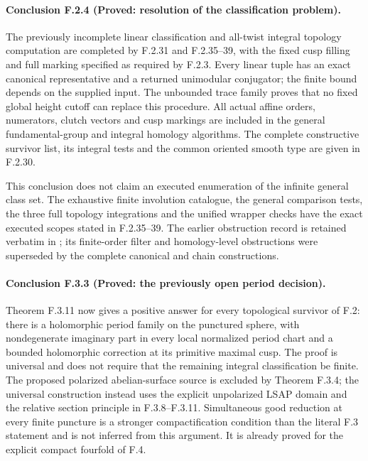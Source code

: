 \paragraph{Conclusion F.2.4 (Proved: resolution of the classification problem).}
The previously incomplete linear classification and all-twist
integral topology computation are completed by F.2.31 and
F.2.35--39, with the fixed cusp filling and full marking
specified as required by F.2.3.  Every linear tuple has an
exact canonical representative and a returned unimodular
conjugator; the finite bound depends on the supplied input.
The unbounded trace family proves that no fixed global
height cutoff can replace this procedure.  All actual affine
orders, numerators, clutch vectors and cusp markings are
included in the general fundamental-group and integral
homology algorithms.  The complete constructive survivor
list, its integral tests and the common oriented smooth
type are given in F.2.30.

This conclusion does not claim an executed enumeration of
the infinite general class set.  The exhaustive finite
involution catalogue, the general comparison tests, the
three full topology integrations and the unified wrapper
checks have the exact executed scopes stated in F.2.35--39.
The earlier obstruction record is retained verbatim in
; its finite-order
filter and homology-level obstructions were superseded by
the complete canonical and chain constructions.

\paragraph{Conclusion F.3.3 (Proved: the previously open period decision).}
Theorem F.3.11 now gives a positive answer for every topological
survivor of F.2: there is a holomorphic period family on the
punctured sphere, with nondegenerate imaginary part in every
local normalized period chart and a bounded holomorphic
correction at its primitive maximal cusp.  The proof is universal
and does not require that the remaining integral classification
be finite.  The proposed polarized abelian-surface source is
excluded by Theorem F.3.4; the universal construction instead
uses the explicit unpolarized LSAP domain and the relative
section principle in F.3.8--F.3.11.  Simultaneous good reduction
at every finite puncture is a stronger compactification condition
than the literal F.3 statement and is not inferred from this
argument.  It is already proved for the explicit compact
fourfold of F.4.
